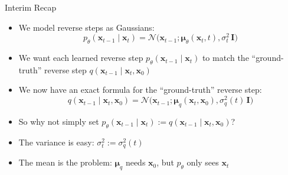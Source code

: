 \documentclass[11pt,compress,t,notes=noshow, xcolor=table]{beamer}
\providecommand{\bx}{\mathbf{x}}
\begin{document}
 \begin{frame}{Interim Recap}


\vfill

\begin{itemize}
\item We model reverse steps as Gaussians:
\begin{equation*}
p_\theta(\bx_{t-1} \mid \bx_t) = \mathcal{N}\big(\bx_{t-1}; \boldsymbol{\mu}_\theta(\bx_t, t), \sigma_t^2\, \mathbf{I}\big)
\end{equation*}
\item We want each learned reverse step $p_\theta(\bx_{t-1} \mid \bx_t)$ to match the ``ground-truth'' reverse step $q(\bx_{t-1} \mid \bx_t, \bx_0)$
\item We now have an exact formula for the ``ground-truth'' reverse step:
\begin{equation*}
q(\bx_{t-1} \mid \bx_t, \bx_0) = \mathcal{N}\big(\bx_{t-1}; \boldsymbol{\mu}_q(\bx_t,\bx_0), \sigma_q^2(t)\, \mathbf{I}\big)
\end{equation*}
\item So why not simply set $p_\theta(\bx_{t-1} \mid \bx_t) := q(\bx_{t-1} \mid \bx_t, \bx_0)$?
\item<2-> The variance is easy: $\sigma_t^2 := \sigma_q^2(t)$
\item<2-> The mean is the problem: $\boldsymbol{\mu}_q$ needs $\bx_0$, but $p_\theta$ only sees $\bx_t$
\end{itemize}

\vfill

\end{frame}
\end{document}
